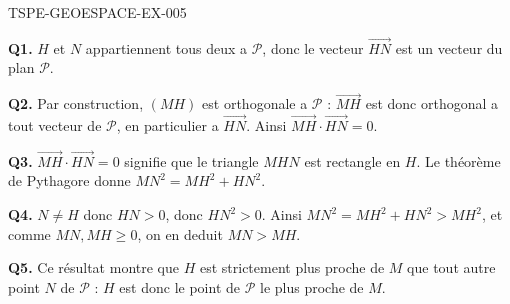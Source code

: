 \begin{corrige}{TSPE-GEOESPACE-EX-005}

\textbf{Q1.} $H$ et $N$ appartiennent tous deux a $\mathcal{P}$, donc le vecteur $\vec{HN}$ est un vecteur du plan $\mathcal{P}$.

\textbf{Q2.} Par construction, $(MH)$ est orthogonale a $\mathcal{P}$ : $\vec{MH}$ est donc orthogonal a tout vecteur de $\mathcal{P}$, en particulier a $\vec{HN}$. Ainsi $\vec{MH}\cdot\vec{HN}=0$.

\textbf{Q3.} $\vec{MH}\cdot\vec{HN}=0$ signifie que le triangle $MHN$ est rectangle en $H$. Le théorème de Pythagore donne $MN^2 = MH^2+HN^2$.

\textbf{Q4.} $N
\neq H$ donc $HN>0$, donc $HN^2>0$. Ainsi $MN^2 = MH^2+HN^2 > MH^2$, et comme $MN,MH\geq0$, on en deduit $MN>MH$.

\textbf{Q5.} Ce résultat montre que $H$ est strictement plus proche de $M$ que tout autre point $N$ de $\mathcal{P}$ : $H$ est donc le point de $\mathcal{P}$ le plus proche de $M$.

\end{corrige}
